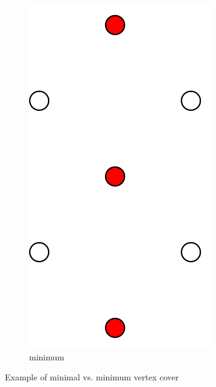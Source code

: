 \begin{figure}[ht]
  \hspace{2em}
  \begin{subfigure}{0.25\textwidth}
    \centering
    \includegraphics[width=\textwidth]{img/example_minimum_vertex_cover.pdf}
    \caption{minimum}
  \end{subfigure}
  \caption{\label{fig:example_vertex_cover}Example of minimal vs. minimum vertex cover}
\end{figure}

